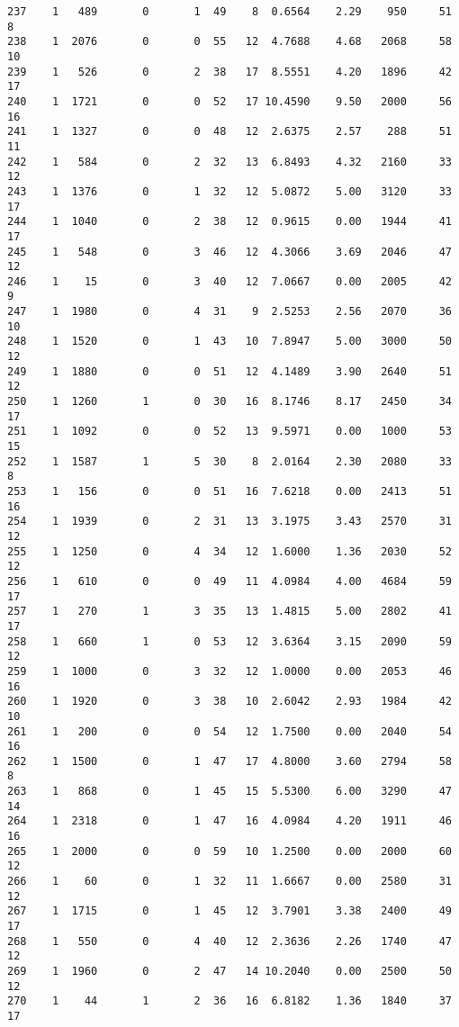 \documentclass[
  letterpaper,
  DIV=11,
  numbers=noendperiod]{scrreprt}
\begin{document}
\begin{verbatim}
237    1   489       0       1  49    8  0.6564    2.29    950     51       8
238    1  2076       0       0  55   12  4.7688    4.68   2068     58      10
239    1   526       0       2  38   17  8.5551    4.20   1896     42      17
240    1  1721       0       0  52   17 10.4590    9.50   2000     56      16
241    1  1327       0       0  48   12  2.6375    2.57    288     51      11
242    1   584       0       2  32   13  6.8493    4.32   2160     33      12
243    1  1376       0       1  32   12  5.0872    5.00   3120     33      17
244    1  1040       0       2  38   12  0.9615    0.00   1944     41      17
245    1   548       0       3  46   12  4.3066    3.69   2046     47      12
246    1    15       0       3  40   12  7.0667    0.00   2005     42       9
247    1  1980       0       4  31    9  2.5253    2.56   2070     36      10
248    1  1520       0       1  43   10  7.8947    5.00   3000     50      12
249    1  1880       0       0  51   12  4.1489    3.90   2640     51      12
250    1  1260       1       0  30   16  8.1746    8.17   2450     34      17
251    1  1092       0       0  52   13  9.5971    0.00   1000     53      15
252    1  1587       1       5  30    8  2.0164    2.30   2080     33       8
253    1   156       0       0  51   16  7.6218    0.00   2413     51      16
254    1  1939       0       2  31   13  3.1975    3.43   2570     31      12
255    1  1250       0       4  34   12  1.6000    1.36   2030     52      12
256    1   610       0       0  49   11  4.0984    4.00   4684     59      17
257    1   270       1       3  35   13  1.4815    5.00   2802     41      17
258    1   660       1       0  53   12  3.6364    3.15   2090     59      12
259    1  1000       0       3  32   12  1.0000    0.00   2053     46      16
260    1  1920       0       3  38   10  2.6042    2.93   1984     42      10
261    1   200       0       0  54   12  1.7500    0.00   2040     54      16
262    1  1500       0       1  47   17  4.8000    3.60   2794     58       8
263    1   868       0       1  45   15  5.5300    6.00   3290     47      14
264    1  2318       0       1  47   16  4.0984    4.20   1911     46      16
265    1  2000       0       0  59   10  1.2500    0.00   2000     60      12
266    1    60       0       1  32   11  1.6667    0.00   2580     31      12
267    1  1715       0       1  45   12  3.7901    3.38   2400     49      17
268    1   550       0       4  40   12  2.3636    2.26   1740     47      12
269    1  1960       0       2  47   14 10.2040    0.00   2500     50      12
270    1    44       1       2  36   16  6.8182    1.36   1840     37      17

\end{verbatim}
\end{document}
